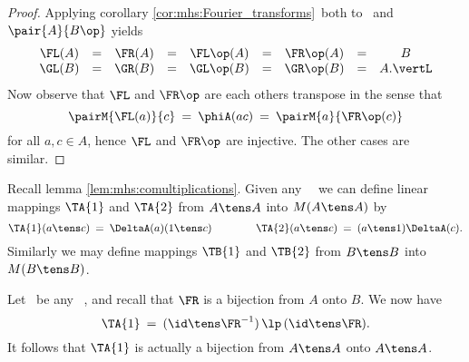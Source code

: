 \begin{proof}
Applying corollary \ref{cor:mhs:Fourier_transforms}\ both to
\pairAB\ and $\pair{A}{B\op}$ yields
$$\begin{array}{ccccccccc}
  \FL(A) &=& \FR(A) &=& \FL\op(A) &=& \FR\op(A) &=& B  \\
  \GL(B) &=& \GR(B) &=& \GL\op(B) &=& \GR\op(B) &=& A. \vertL
  \end{array} $$
Now observe that $\FL$ and $\FR\op$ are each others transpose
in the sense that
$$  \pairM{\FL(a)}{c} \:=\: \phiA(ac) \:=\:  \pairM{a}{\FR\op(c)}  $$
for all $a,c \in A$, hence $\FL$ and $\FR\op$ are injective.
The other cases are similar.
\end{proof}
\vspace{2ex}


Recall lemma \ref{lem:mhs:comultiplications}\@.
Given any \mhs\ \pairAB\ we can define linear mappings
$\TA{1}$ and $\TA{2}$ from $A \tens A$ into $M(A \tens A)$ by
$$ \TA{1}(a \tens c) \:=\: \DeltaA(a)(1 \tens c)
            \hspace{4em}
   \TA{2}(a \tens c) \:=\: (a \tens 1) \DeltaA(c).  $$
Similarly we may define mappings $\TB{1}$ and $\TB{2}$
from $B \tens B$ into $M(B \tens B)$.


\begin{lemma_sec} \label{lem:mhs:TA1}
Let\/ \pairAB\ be any \mr\ \mhs, and
recall that\/ $\FR$ is a bijection from $A$ onto\/ $B$.
We now have
$$   \TA{1} \:=\: (\id \tens \FR^{-1}) \,\lp\, (\id \tens \FR). $$
It follows that\/ $\TA{1}$ is actually a bijection from\/ $A \tens A$ onto\/ $A \tens A$.
\end{lemma_sec}

